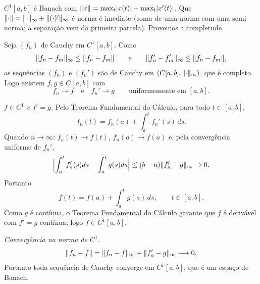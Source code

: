 \begin{exercicio}{$C^1[a,b]$ é Banach com $\lVert x\rVert=\max_t\lvert x(t)\rvert+\max_t\lvert x'(t)\rvert$.}
\sol
Que $\lVert\cdot\rVert=\lVert\cdot\rVert_\infty+\lVert(\cdot)'\rVert_\infty$ é norma é imediato (soma de uma norma com uma semi-norma; a separação vem da primeira parcela). Provemos a completude.

Seja $(f_n)$ de Cauchy em $C^1[a,b]$. Como
\[ \lVert f_n-f_m\rVert_\infty\le\lVert f_n-f_m\rVert\qquad\text{e}\qquad \lVert f_n'-f_m'\rVert_\infty\le\lVert f_n-f_m\rVert, \]
as sequências $(f_n)$ e $(f_n')$ são de Cauchy em $(C[a,b],\lVert\cdot\rVert_\infty)$, que é completo. Logo existem $f,g\in C[a,b]$ com
\[ f_n\to f \quad\text{e}\quad f_n'\to g \qquad\text{uniformemente em } [a,b]. \]

\emph{$f\in C^1$ e $f'=g$.} Pelo Teorema Fundamental do Cálculo, para todo $t\in[a,b]$,
\[ f_n(t)=f_n(a)+\int_a^t f_n'(s)\,ds. \]
Quando $n\to\infty$: $f_n(t)\to f(t)$, $f_n(a)\to f(a)$ e, pela convergência uniforme de $f_n'$,
\[ \Bigl|\int_a^t f_n'(s)ds-\int_a^t g(s)ds\Bigr|\le (b-a)\lVert f_n'-g\rVert_\infty\to0. \]
Portanto
\[ f(t)=f(a)+\int_a^t g(s)\,ds,\qquad t\in[a,b]. \]
Como $g$ é contínua, o Teorema Fundamental do Cálculo garante que $f$ é derivável com $f'=g$ contínua; logo $f\in C^1[a,b]$.

\emph{Convergência na norma de $C^1$.}
\[ \lVert f_n-f\rVert=\lVert f_n-f\rVert_\infty+\lVert f_n'-g\rVert_\infty\longrightarrow0. \]
Portanto toda sequência de Cauchy converge em $C^1[a,b]$, que é um espaço de Banach.
\end{exercicio}

